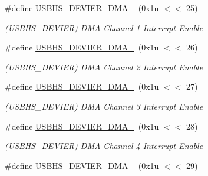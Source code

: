 \begin{DoxyCompactItemize}
\mbox{\label{group__SAMS70__USBHS_ga818377ea55b0df1a3425ecd4a75d93b3}} 
\#define \mbox{\hyperlink{group__SAMS70__USBHS_ga818377ea55b0df1a3425ecd4a75d93b3}{U\+S\+B\+H\+S\+\_\+\+D\+E\+V\+I\+E\+R\+\_\+\+D\+M\+A\+\_}}~(0x1u $<$$<$ 25)
\begin{DoxyCompactList}\small\item\em (U\+S\+B\+H\+S\+\_\+\+D\+E\+V\+I\+ER) D\+MA Channel 1 Interrupt Enable \end{DoxyCompactList}\item 
\mbox{\label{group__SAMS70__USBHS_ga77e6f737a9a0d19a659faebd731f5efe}} 
\#define \mbox{\hyperlink{group__SAMS70__USBHS_ga77e6f737a9a0d19a659faebd731f5efe}{U\+S\+B\+H\+S\+\_\+\+D\+E\+V\+I\+E\+R\+\_\+\+D\+M\+A\+\_}}~(0x1u $<$$<$ 26)
\begin{DoxyCompactList}\small\item\em (U\+S\+B\+H\+S\+\_\+\+D\+E\+V\+I\+ER) D\+MA Channel 2 Interrupt Enable \end{DoxyCompactList}\item 
\mbox{\label{group__SAMS70__USBHS_ga6022a0b8ecbc042bd7efd4d85460946a}} 
\#define \mbox{\hyperlink{group__SAMS70__USBHS_ga6022a0b8ecbc042bd7efd4d85460946a}{U\+S\+B\+H\+S\+\_\+\+D\+E\+V\+I\+E\+R\+\_\+\+D\+M\+A\+\_}}~(0x1u $<$$<$ 27)
\begin{DoxyCompactList}\small\item\em (U\+S\+B\+H\+S\+\_\+\+D\+E\+V\+I\+ER) D\+MA Channel 3 Interrupt Enable \end{DoxyCompactList}\item 
\mbox{\label{group__SAMS70__USBHS_ga9178945c2ec5b054a9fd64561189b413}} 
\#define \mbox{\hyperlink{group__SAMS70__USBHS_ga9178945c2ec5b054a9fd64561189b413}{U\+S\+B\+H\+S\+\_\+\+D\+E\+V\+I\+E\+R\+\_\+\+D\+M\+A\+\_}}~(0x1u $<$$<$ 28)
\begin{DoxyCompactList}\small\item\em (U\+S\+B\+H\+S\+\_\+\+D\+E\+V\+I\+ER) D\+MA Channel 4 Interrupt Enable \end{DoxyCompactList}\item 
\mbox{\label{group__SAMS70__USBHS_ga44eeff27bff5b15f577c4fe9962a3fdc}} 
\#define \mbox{\hyperlink{group__SAMS70__USBHS_ga44eeff27bff5b15f577c4fe9962a3fdc}{U\+S\+B\+H\+S\+\_\+\+D\+E\+V\+I\+E\+R\+\_\+\+D\+M\+A\+\_}}~(0x1u $<$$<$ 29)
$$
\end{DoxyCompactItemize}
